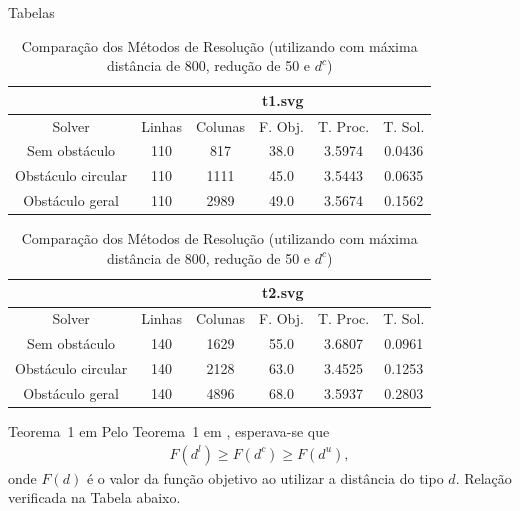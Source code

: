 \documentclass[11pt]{beamer}
\begin{document}
\begin{frame}{Tabelas}
\begin{table}
    \centering
    \caption{Comparação dos Métodos de Resolução (utilizando com máxima distância de 800, redução de 50 e $d^c$)}
    \label{tab:solver}
    \begin{tabular}{|c|c|c|c|c|c|}
        \hline
        & \multicolumn{5}{|c|}{t1.svg} \\ \hline
        Solver & Linhas & Colunas & F. Obj. & T. Proc. & T. Sol. \\ \hline
        Sem obstáculo & 110 & 817 & 38.0 & 3.5974 & 0.0436 \\ \hline
        Obstáculo circular & 110 & 1111 & 45.0 & 3.5443 & 0.0635 \\ \hline
        Obstáculo geral & 110 & 2989 & 49.0 & 3.5674 & 0.1562  \\ \hline
    \end{tabular}
    \begin{tabular}{|c|c|c|c|c|c|}
        \hline
		& \multicolumn{5}{|c|}{t2.svg} \\ \hline
		Solver & Linhas & Colunas & F. Obj. & T. Proc. & T. Sol. \\ \hline
		Sem obstáculo & 140 & 1629 & 55.0 & 3.6807 & 0.0961  \\ \hline 
		Obstáculo circular & 140 & 2128 & 63.0 & 3.4525 & 0.1253  \\ \hline
		Obstáculo geral & 140 & 4896 & 68.0 & 3.5937 & 0.2803 \\ \hline
    \end{tabular}
\end{table}
\end{frame}

\begin{frame}
\begin{block}{Teorema~1 em \cite{Andjel:1989:TP}}
Pelo Teorema~1 em \cite{Andjel:1989:TP}, esperava-se que 
\begin{align*}
    F(d^l) \geq F(d^c) \geq F(d^u),
\end{align*}
onde $F(d)$ é o valor da função objetivo ao utilizar a distância do tipo $d$.
Relação verificada na Tabela abaixo. %
\end{block}
\end{frame}
\end{document}
